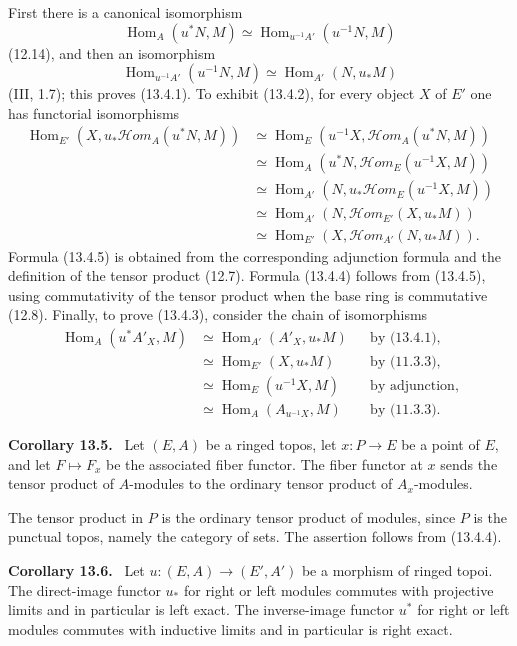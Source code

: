 \documentclass[11pt]{article}
\newcommand{\Hom}{\operatorname{Hom}}
\newcommand{\scrHom}{\mathscr{H}\!om}
\newenvironment{statement}[1]{\par\medskip\noindent\textbf{#1.}\ }{\par\medskip}
\begin{document}
First there is a canonical isomorphism
\[
\Hom_A(u^*N,M)\simeq \Hom_{u^{-1}A'}(u^{-1}N,M)
\]
(12.14), and then an isomorphism
\[
\Hom_{u^{-1}A'}(u^{-1}N,M)\simeq \Hom_{A'}(N,u_*M)
\]
(III, 1.7); this proves (13.4.1). To exhibit (13.4.2), for every object $X$ of $E'$ one has functorial isomorphisms
\begin{align*}
\Hom_{E'}(X,u_*\scrHom_A(u^*N,M))
&\simeq \Hom_E(u^{-1}X,\scrHom_A(u^*N,M))\\
&\simeq \Hom_A(u^*N,\scrHom_E(u^{-1}X,M))\\
&\simeq \Hom_{A'}(N,u_*\scrHom_E(u^{-1}X,M))\\
&\simeq \Hom_{A'}(N,\scrHom_{E'}(X,u_*M))\\
&\simeq \Hom_{E'}(X,\scrHom_{A'}(N,u_*M)).
\end{align*}
Formula (13.4.5) is obtained from the corresponding adjunction formula and the definition of the tensor product (12.7). Formula (13.4.4) follows from (13.4.5), using commutativity of the tensor product when the base ring is commutative (12.8). Finally, to prove (13.4.3), consider the chain of isomorphisms
\begin{align*}
\Hom_A(u^*A'_X,M)&\simeq \Hom_{A'}(A'_X,u_*M) &&\text{by (13.4.1)},\\
&\simeq \Hom_{E'}(X,u_*M) &&\text{by (11.3.3)},\\
&\simeq \Hom_E(u^{-1}X,M) &&\text{by adjunction},\\
&\simeq \Hom_A(A_{u^{-1}X},M) &&\text{by (11.3.3).}
\end{align*}

\begin{statement}{Corollary 13.5}
Let $(E,A)$ be a ringed topos, let $x:P\to E$ be a point of $E$, and let $F\mapsto F_x$ be the associated fiber functor. The fiber functor at $x$ sends the tensor product of $A$-modules to the ordinary tensor product of $A_x$-modules.
\end{statement}

The tensor product in $P$ is the ordinary tensor product of modules, since $P$ is the punctual topos, namely the category of sets. The assertion follows from (13.4.4).

\begin{statement}{Corollary 13.6}
Let $u:(E,A)\to(E',A')$ be a morphism of ringed topoi. The direct-image functor $u_*$ for right or left modules commutes with projective limits and in particular is left exact. The inverse-image functor $u^*$ for right or left modules commutes with inductive limits and in particular is right exact.
\end{statement}
\end{document}

